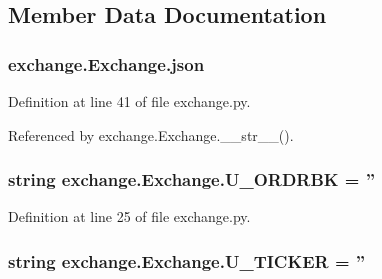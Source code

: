 \subsection{Member Data Documentation}
\hypertarget{classexchange_1_1_exchange_a6ce8e0779d98031b1cd9200d2a0fa5ad}{
\subsubsection[{json}]{\setlength{\rightskip}{0pt plus 5cm}exchange.\-Exchange.\-json}}\label{classexchange_1_1_exchange_a6ce8e0779d98031b1cd9200d2a0fa5ad}


Definition at line 41 of file exchange.\-py.



Referenced by exchange.\-Exchange.\-\_\-\-\_\-str\-\_\-\-\_\-().

\hypertarget{classexchange_1_1_exchange_a83174d2fe96a1c737231d3b8b18d9807}{
\subsubsection[{U\-\_\-\-O\-R\-D\-R\-B\-K}]{\setlength{\rightskip}{0pt plus 5cm}string exchange.\-Exchange.\-U\-\_\-\-O\-R\-D\-R\-B\-K = ''\hspace{0.3cm}{\ttfamily [static]}}}\label{classexchange_1_1_exchange_a83174d2fe96a1c737231d3b8b18d9807}


Definition at line 25 of file exchange.\-py.

\hypertarget{classexchange_1_1_exchange_ab16df02480d727c533b02b5b7afa053b}{
\subsubsection[{U\-\_\-\-T\-I\-C\-K\-E\-R}]{\setlength{\rightskip}{0pt plus 5cm}string exchange.\-Exchange.\-U\-\_\-\-T\-I\-C\-K\-E\-R = ''\hspace{0.3cm}{\ttfamily [static]}}}\label{classexchange_1_1_exchange_ab16df02480d727c533b02b5b7afa053b}


